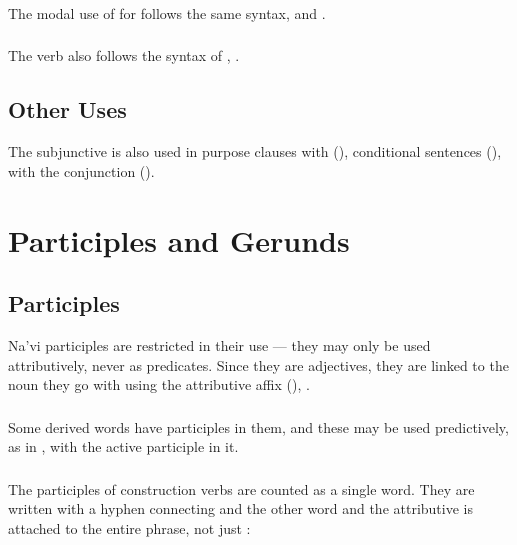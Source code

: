 \subsubsection{} The modal use of   for 
follows the same syntax,   and  .  

\subsubsection{} The verb   also follows the syntax
of ,   
.

\subsection{Other Uses} The subjunctive is also used in purpose
clauses with  (), conditional sentences
(), with the conjunction 
 (). 


\section{Participles and Gerunds}

\subsection{Participles} 
Na'vi participles are restricted in their use --- they may only be
used attributively, never as predicates.  Since they are adjectives,
they are linked to the noun they go with using the attributive affix
 (),  .\label{syn:part:attr}

\subsubsection{} Some derived words have participles in them, and
these may be used predictively, as in 
, with the active participle  in it.

\subsubsection{} The participles of  construction verbs are
counted as a single word.  They are written with a hyphen connecting
 and the other word and the attributive  is attached to the
entire phrase, not just : \label{syn:participle:si-const}


